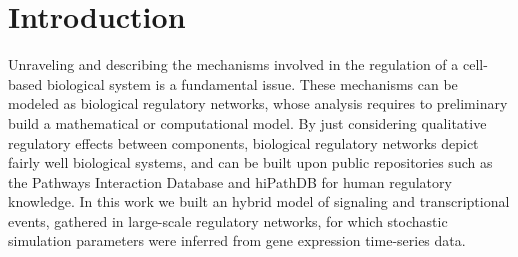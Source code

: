 
\section{Introduction}






Unraveling and describing the mechanisms involved in the regulation of a cell-based biological system is a fundamental 
issue. These mechanisms can be modeled as biological regulatory networks, whose analysis requires to preliminary build a 
mathematical or computational model. 
By just considering qualitative regulatory effects between components, biological regulatory networks
depict fairly well biological systems, and can be built upon public repositories such as the Pathways 
Interaction Database \cite{schaefer2009pid} and  
hiPathDB \cite{yu2012hipathdb} for human regulatory knowledge.
In this work we built an hybrid model of signaling and transcriptional events, gathered in large-scale regulatory networks, 
for which stochastic simulation parameters were inferred from 
gene expression time-series data.  


